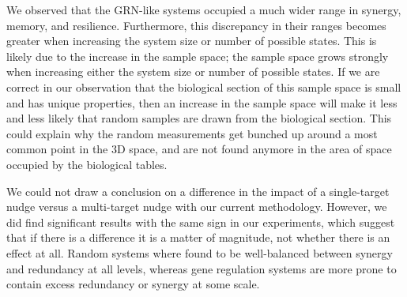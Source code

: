 \documentclass[../main.tex]{subfiles}
\begin{document}
We observed that the GRN-like systems occupied a much wider range in synergy, memory, and resilience.
Furthermore, this discrepancy in their ranges becomes greater when increasing the system size or number of possible states.
This is likely due to the increase in the sample space; the sample space grows strongly when increasing either the system size or number of possible states.
If we are correct in our observation that the biological section of this sample space is small and has unique properties, then an increase in the sample space will make it less and less likely that random samples are drawn from the biological section.
This could explain why the random measurements get bunched up around a most common point in the 3D space, and are not found anymore in the area of space occupied by the biological tables.

We could not draw a conclusion on a difference in the impact of a single-target nudge versus a multi-target nudge with our current methodology.
However, we did find significant results with the same sign in our experiments, which suggest that if there is a difference it is a matter of magnitude, not whether there is an effect at all.
Random systems where found to be well-balanced between synergy and redundancy at all levels, whereas gene regulation systems are more prone to contain excess redundancy or synergy at some scale.
\end{document}
